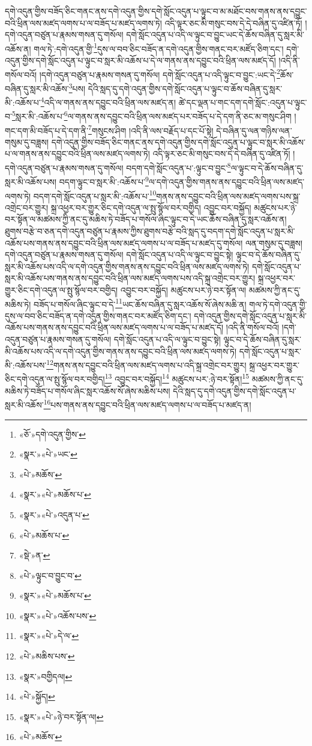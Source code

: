 དགེ་འདུན་གྱིས་བཟོད་ཅིང་གནང་ནས་དགེ་འདུན་གྱིས་དགེ་སློང་འདུན་པ་ལྟུང་བ་མ་མཐོང་བས་གནས་ནས་དབྱུང་བའི་ཕྲིན་ལས་མཛད་ལགས་པ་ལ་བཟོད་པ་མཛད་ལགས་ཏེ། འདི་ལྟར་ཅང་མི་གསུང་བས་དེ་དེ་བཞིན་དུ་འཛིན་ཏོ། །དགེ་འདུན་བཙུན་པ་རྣམས་གསན་དུ་གསོལ། དགེ་སློང་འདུན་པ་འདི་ལ་ལྟུང་བ་བྱུང་ཡང་དེ་ཆོས་བཞིན་དུ་སླར་མི་འཆོས་ན། གལ་ཏེ་:དགེ་འདུན་གྱི་\footnote{«ཅོ་»དགེ་འདུན་གྱིས་}དུས་ལ་བབ་ཅིང་བཟོད་ན་དགེ་འདུན་གྱིས་གནང་བར་མཛོད་ཅིག་དང་། དགེ་འདུན་གྱིས་དགེ་སློང་འདུན་པ་ལྟུང་བ་སླར་མི་འཆོས་པ་དེ་ལ་གནས་ནས་དབྱུང་བའི་ཕྲིན་ལས་མཛད་དོ། །འདི་ནི་གསོལ་བའོ། །དགེ་འདུན་བཙུན་པ་རྣམས་གསན་དུ་གསོལ། དགེ་སློང་འདུན་པ་འདི་ལྟུང་བ་བྱུང་:ཡང་དེ་\footnote{«སྣར་»«པེ་»ཡང་}ཆོས་བཞིན་དུ་སླར་མི་འཆོས་\footnote{«པེ་»མཆོས་}པས། དེའི་སླད་དུ་དགེ་འདུན་གྱིས་དགེ་སློང་འདུན་པ་ལྟུང་བ་ཆོས་བཞིན་དུ་སླར་མི་:འཆོས་པ་\footnote{«སྣར་»«པེ་»མཆོས་པ་}འདི་ལ་གནས་ནས་དབྱུང་བའི་ཕྲིན་ལས་མཛད་ན། ཚེ་དང་ལྡན་པ་གང་དག་དགེ་སློང་:འདུན་པ་ལྟུང་བ་\footnote{«སྣར་»«པེ་»འདུན་པ་}སླར་མི་:འཆོས་པ་\footnote{«པེ་»མཆོས་པ་}ལ་གནས་ནས་དབྱུང་བའི་ཕྲིན་ལས་མཛད་པར་བཟོད་པ་དེ་དག་ནི་ཅང་མ་གསུང་ཤིག །གང་དག་མི་བཟོད་པ་དེ་དག་ནི་\footnote{«སྡེ་»ན་}གསུངས་ཤིག །འདི་ནི་ལས་བརྗོད་པ་དང་པོ་སྟེ། དེ་བཞིན་དུ་ལན་གཉིས་ལན་གསུམ་དུ་བཟླས། དགེ་འདུན་གྱིས་བཟོད་ཅིང་གནང་ནས་དགེ་འདུན་གྱིས་དགེ་སློང་འདུན་པ་ལྟུང་བ་སླར་མི་འཆོས་པ་ལ་གནས་ནས་དབྱུང་བའི་ཕྲིན་ལས་མཛད་ལགས་ཏེ། འདི་ལྟར་ཅང་མི་གསུང་བས་དེ་དེ་བཞིན་དུ་འཛིན་ཏོ། །དགེ་འདུན་བཙུན་པ་རྣམས་གསན་དུ་གསོལ། བདག་དགེ་སློང་འདུན་པ་:ལྟུང་བ་བྱུང་\footnote{«པེ་»ལྟུང་བ་བྱུང་བ་}ལ་ལྟུང་བ་དེ་ཆོས་བཞིན་དུ་སླར་མི་འཆོས་པས། བདག་ལྟུང་བ་སླར་མི་:འཆོས་པ་\footnote{«སྣར་»«པེ་»མཆོས་པ་}ལ་དགེ་འདུན་གྱིས་གནས་ནས་དབྱུང་བའི་ཕྲིན་ལས་མཛད་ལགས་ཏེ། བདག་དགེ་སློང་འདུན་པ་སླར་མི་:འཆོས་པ་\footnote{«སྣར་»«པེ་»འཆོས་པས་}གནས་ནས་དབྱུང་བའི་ཕྲིན་ལས་མཛད་ལགས་པས་སྐྲ་འགྲེང་བར་གྱུར། སྐྲ་འཕྱར་བར་གྱུར་ཅིང་དགེ་འདུན་ལ་སྤུ་སྙོལ་བར་བགྱིད། འབྱུང་བར་བསྐྱོད། མཚུངས་པར་ཉེ་བར་སྟོན་ལ་མཚམས་ཀྱི་ནང་དུ་མཆིས་ཏེ་བཟོད་པ་གསོལ་ཞིང་ལྟུང་བ་དེ་ཡང་ཆོས་བཞིན་དུ་སླར་འཆོས་ན། ཐུགས་བརྩེ་བ་ཅན་དགེ་འདུན་བཙུན་པ་རྣམས་ཀྱིས་ཐུགས་བརྩེ་བའི་སླད་དུ་བདག་དགེ་སློང་འདུན་པ་སླར་མི་འཆོས་པས་གནས་ནས་དབྱུང་བའི་ཕྲིན་ལས་མཛད་ལགས་པ་ལ་བཟོད་པ་མཛད་དུ་གསོལ། ལན་གསུམ་དུ་བཟླས། དགེ་འདུན་བཙུན་པ་རྣམས་གསན་དུ་གསོལ། དགེ་སློང་འདུན་པ་འདི་ལ་ལྟུང་བ་བྱུང་སྟེ། ལྟུང་བ་དེ་ཆོས་བཞིན་དུ་སླར་མི་འཆོས་པས་འདི་ལ་དགེ་འདུན་གྱིས་གནས་ནས་དབྱུང་བའི་ཕྲིན་ལས་མཛད་ལགས་ཏེ། དགེ་སློང་འདུན་པ་སླར་མི་འཆོས་པས་གནས་ནས་དབྱུང་བའི་ཕྲིན་ལས་མཛད་ལགས་པས་འདི་སྐྲ་འགྲེང་བར་གྱུར། སྐྲ་འཕྱར་བར་གྱུར་ཅིང་དགེ་འདུན་ལ་སྤུ་སྙོལ་བར་བགྱིད། འབྱུང་བར་བསྐྱོད། མཚུངས་པར་ཉེ་བར་སྟོན་ལ། མཚམས་ཀྱི་ནང་དུ་མཆིས་ཏེ། བཟོད་པ་གསོལ་ཞིང་ལྟུང་བ་དེ་\footnote{«སྣར་»«པེ་»དེ་ལ་}ཡང་ཆོས་བཞིན་དུ་སླར་འཆོས་སོ་ཞེས་མཆི་ན། གལ་ཏེ་དགེ་འདུན་གྱི་དུས་ལ་བབ་ཅིང་བཟོད་ན་དགེ་འདུན་གྱིས་གནང་བར་མཛོད་ཅིག་དང་། དགེ་འདུན་གྱིས་དགེ་སློང་འདུན་པ་སླར་མི་འཆོས་པས་གནས་ནས་དབྱུང་བའི་ཕྲིན་ལས་མཛད་ལགས་པ་ལ་བཟོད་པ་མཛད་དོ། །འདི་ནི་གསོལ་བའོ། །དགེ་འདུན་བཙུན་པ་རྣམས་གསན་དུ་གསོལ། དགེ་སློང་འདུན་པ་འདི་ལ་ལྟུང་བ་བྱུང་སྟེ། ལྟུང་བ་དེ་ཆོས་བཞིན་དུ་སླར་མི་འཆོས་པས་འདི་ལ་དགེ་འདུན་གྱིས་གནས་ནས་དབྱུང་བའི་ཕྲིན་ལས་མཛད་ལགས་ཏེ། དགེ་སློང་འདུན་པ་སླར་མི་:འཆོས་པས་\footnote{«པེ་»མཆིས་པས་}གནས་ནས་དབྱུང་བའི་ཕྲིན་ལས་མཛད་ལགས་པ་འདི་སྐྲ་འགྲེང་བར་གྱུར། སྐྲ་འཕྱར་བར་གྱུར་ཅིང་དགེ་འདུན་ལ་སྤུ་སྙོལ་བར་བགྱིད།\footnote{«སྣར་»བགྱིདལ།} འབྱུང་བར་བསྐྱོད།\footnote{«པེ་»སྐྱོད།} མཚུངས་པར་:ཉེ་བར་སྟོན།\footnote{«སྣར་»«པེ་»ཉེ་བར་སྟོན་ལ།} མཚམས་ཀྱི་ནང་དུ་མཆིས་ཏེ་བཟོད་པ་གསོལ་ཞིང་སླར་འཆོས་སོ་ཞེས་མཆིས་པས། དེའི་སླད་དུ་དགེ་འདུན་གྱིས་དགེ་སློང་འདུན་པ་སླར་མི་འཆོས་\footnote{«པེ་»མཆོས་}པས་གནས་ནས་དབྱུང་བའི་ཕྲིན་ལས་མཛད་ལགས་པ་ལ་བཟོད་པ་མཛད་ན། 